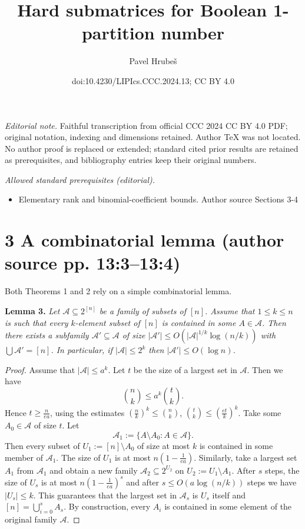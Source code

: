\documentclass[10pt,a4paper]{article}
\title{Hard submatrices for Boolean 1-partition number}
\author{Pavel Hrubeš}
\date{doi:10.4230/LIPIcs.CCC.2024.13; CC BY 4.0}
\newenvironment{originalresult}[1]{\par\medskip\noindent\textbf{#1.}\itshape}{\par\medskip}
\begin{document}
\maketitle
\noindent\textit{Editorial note.} Faithful transcription from official CCC 2024 CC BY 4.0 PDF; original notation, indexing and dimensions retained. Author TeX was not located. No author proof is replaced or extended; standard cited prior results are retained as prerequisites, and bibliography entries keep their original numbers.\par\medskip
\noindent\textit{Allowed standard prerequisites (editorial).}\begin{itemize}
\item Elementary rank and binomial-coefficient bounds. Author source Sections 3-4
\end{itemize}\medskip
\section*{3 A combinatorial lemma (author source pp. 13:3--13:4)}
Both Theorems 1 and 2 rely on a simple combinatorial lemma.
\begin{originalresult}{Lemma 3}
Let $\mathcal A\subseteq 2^{[n]}$ be a family of subsets of $[n]$. Assume that $1\le k\le n$ is such that every $k$-element subset of $[n]$ is contained in some $A\in\mathcal A$. Then there exists a subfamily $\mathcal A'\subseteq\mathcal A$ of size $|\mathcal A'|\le O(|\mathcal A|^{1/k}\log(n/k))$ with $\bigcup\mathcal A'=[n]$. In particular, if $|\mathcal A|\le 2^k$ then $|\mathcal A'|\le O(\log n)$.
\end{originalresult}
\begin{proof}
Assume that $|\mathcal A|\le a^k$. Let $t$ be the size of a largest set in $\mathcal A$. Then we have
\[\binom nk\le a^k\binom tk.\]
Hence $t\ge\frac n{ea}$, using the estimates $(\frac nk)^k\le\binom nk$, $\binom tk\le(\frac{et}k)^k$. Take some $A_0\in\mathcal A$ of size $t$. Let
\[\mathcal A_1:=\{A\setminus A_0:A\in\mathcal A\}.\]
Then every subset of $U_1:=[n]\setminus A_0$ of size at most $k$ is contained in some member of $\mathcal A_1$. The size of $U_1$ is at most $n(1-\frac1{ea})$. Similarly, take a largest set $A_1$ from $\mathcal A_1$ and obtain a new family $\mathcal A_2\subseteq 2^{U_2}$ on $U_2:=U_1\setminus A_1$. After $s$ steps, the size of $U_s$ is at most $n(1-\frac1{ea})^s$ and after $s\le O(a\log(n/k))$ steps we have $|U_s|\le k$. This guarantees that the largest set in $\mathcal A_s$ is $U_s$ itself and $[n]=\bigcup_{i=0}^s A_s$. By construction, every $A_i$ is contained in some element of the original family $\mathcal A$.
\end{proof}
\end{document}
